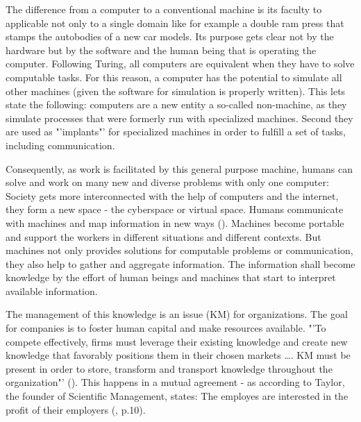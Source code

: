 The difference from a computer to a conventional machine is its faculty to applicable not only to a single domain like for example a double ram press that stamps the autobodies of a new car models. Its purpose gets clear not by the hardware but by the software and the human being that is operating the computer. Following Turing, all computers are equivalent when they have to solve computable tasks. For this reason, a computer has the potential to simulate all other machines (given the software for simulation is properly written). This lets \cite{buhl1997virtuelle} state the following: computers are a new entity a so-called non-machine, as they simulate processes that were formerly run with specialized machines. Second they are used as "'implants"' for specialized machines in order to fulfill a set of tasks, including communication. 

Consequently, as work is facilitated by this general purpose machine, humans can solve and work on many new and diverse problems with only one computer: Society gets more interconnected with the help of computers and the internet, they form a new space - the cyberspace or virtual space. Humans communicate with machines and map information in new ways (\cite{dodge2001atlas}). Machines become portable and support the workers in different situations and different contexts. But machines not only provides solutions for computable problems or communication, they also help to gather and aggregate information. The information shall become knowledge by the effort of human beings and machines that start to interpret available information. 

The management of this knowledge is an issue (\ac{KM}) for organizations. The goal for companies is to foster human capital and make resources available.  "'To compete effectively, firms must leverage their existing knowledge and create new knowledge that favorably positions them in their chosen markets \dots. \acs{KM} must be present in order to store, transform and transport knowledge throughout the organization"' (\cite{gold2001knowledge}). This happens in a mutual agreement - as according to Taylor, the founder of Scientific Management, states: The employes are interested in the profit of their employers (\cite{taylor2013scientific}, p.10).

